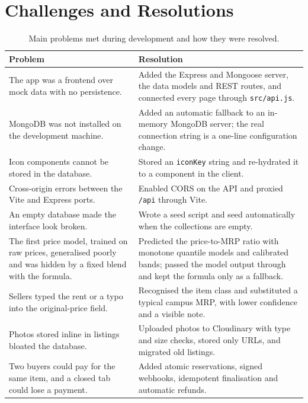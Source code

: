 \documentclass[11pt,letterpaper,oneside]{report}
\newcommand{\code}[1]{\texttt{#1}}
\begin{document}
\section{Challenges and Resolutions}
\begin{table}[h]
\centering
\caption{Main problems met during development and how they were resolved.}\label{tab:challenges}
\small
\begin{tabularx}{\textwidth}{@{}L{5.2cm}X@{}}
\toprule
\textbf{Problem} & \textbf{Resolution}\\
\midrule
The app was a frontend over mock data with no persistence. & Added the Express and Mongoose server, the data
models and REST routes, and connected every page through \code{src/api.js}.\\
MongoDB was not installed on the development machine. & Added an automatic fallback to an in-memory MongoDB
server; the real connection string is a one-line configuration change.\\
Icon components cannot be stored in the database. & Stored an \code{iconKey} string and re-hydrated it to a
component in the client.\\
Cross-origin errors between the Vite and Express ports. & Enabled CORS on the API and proxied \code{/api}
through Vite.\\
An empty database made the interface look broken. & Wrote a seed script and seed automatically when the
collections are empty.\\
The first price model, trained on raw prices, generalised poorly and was hidden by a fixed blend with the
formula. & Predicted the price-to-MRP ratio with monotone quantile models and calibrated bands; passed the
model output through and kept the formula only as a fallback.\\
Sellers typed the rent or a typo into the original-price field. & Recognised the item class and substituted
a typical campus MRP, with lower confidence and a visible note.\\
Photos stored inline in listings bloated the database. & Uploaded photos to Cloudinary with type and size checks,
stored only URLs, and migrated old listings.\\
Two buyers could pay for the same item, and a closed tab could lose a payment. & Added atomic reservations,
signed webhooks, idempotent finalisation and automatic refunds.\\
\bottomrule
\end{tabularx}
\end{table}
\end{document}
